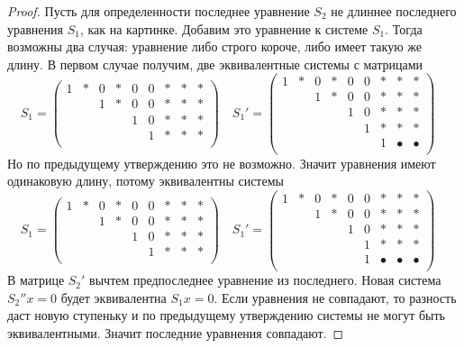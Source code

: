 \begin{proof}
Пусть для определенности последнее уравнение $S_2$ не длиннее последнего уравнения $S_1$, как на картинке.
Добавим это уравнение к системе $S_1$.
Тогда возможны два случая: уравнение либо строго короче, либо имеет такую же длину.
В первом случае получим, две эквивалентные системы с матрицами
\[
S_1 = 
\begin{pmatrix}
{1}&{*}&{0}&{*}&{0}&{0}&{*}&{*}&{*}\\
{}&{}&{1}&{*}&{0}&{0}&{*}&{*}&{*}\\
{}&{}&{}&{}&{1}&{0}&{*}&{*}&{*}\\
{}&{}&{}&{}&{}&{1}&{*}&{*}&{*}\\
\end{pmatrix}\quad
S_1' = 
\begin{pmatrix}
{1}&{*}&{0}&{*}&{0}&{0}&{*}&{*}&{*}\\
{}&{}&{1}&{*}&{0}&{0}&{*}&{*}&{*}\\
{}&{}&{}&{}&{1}&{0}&{*}&{*}&{*}\\
{}&{}&{}&{}&{}&{1}&{*}&{*}&{*}\\
{}&{}&{}&{}&{}&{}&{1}&{\bullet}&{\bullet}\\
\end{pmatrix}\quad
\]
Но по предыдущему утверждению это не возможно.
Значит уравнения имеют одинаковую длину, потому эквивалентны системы
\[
S_1 = 
\begin{pmatrix}
{1}&{*}&{0}&{*}&{0}&{0}&{*}&{*}&{*}\\
{}&{}&{1}&{*}&{0}&{0}&{*}&{*}&{*}\\
{}&{}&{}&{}&{1}&{0}&{*}&{*}&{*}\\
{}&{}&{}&{}&{}&{1}&{*}&{*}&{*}\\
\end{pmatrix}\quad
S_1' = 
\begin{pmatrix}
{1}&{*}&{0}&{*}&{0}&{0}&{*}&{*}&{*}\\
{}&{}&{1}&{*}&{0}&{0}&{*}&{*}&{*}\\
{}&{}&{}&{}&{1}&{0}&{*}&{*}&{*}\\
{}&{}&{}&{}&{}&{1}&{*}&{*}&{*}\\
{}&{}&{}&{}&{}&{1}&{\bullet}&{\bullet}&{\bullet}\\
\end{pmatrix}\quad
\]
В матрице $S_2'$ вычтем предпоследнее уравнение из последнего.
Новая система  $S_2''x=0$ будет эквивалентна $S_1x =0$.
Если уравнения не совпадают, то разность даст новую ступеньку и по предыдущему утверждению системы не могут быть эквивалентными.
Значит последние уравнения совпадают.


\end{proof}
